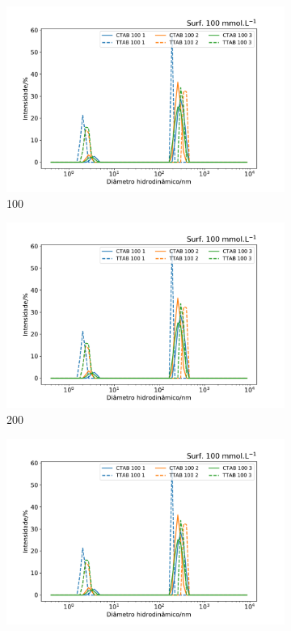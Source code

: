 \begin{figure}[H]
	\begin{subfigure}{0.3\textwidth}
		\centering
		\includegraphics[width=\textwidth]{imagens/dls/100_distrib}
		\caption{100\mM}
		\label{fig:DLS_100_distrib}
	\end{subfigure} %
	\begin{subfigure}{0.3\textwidth}
		\centering
		\includegraphics[width=\textwidth]{imagens/dls/200_distrib}
		\caption{200\mM}
		\label{fig:DLS_200_distrib}
		\end{subfigure} %
	\begin{subfigure}{0.3\textwidth}
		\centering
		\includegraphics[width=\textwidth]{imagens/dls/300_distrib}

\end{subfigure}
\end{figure}
